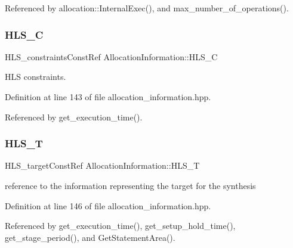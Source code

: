 Referenced by allocation\+::\+Internal\+Exec(), and max\+\_\+number\+\_\+of\+\_\+operations().

\mbox{\label{classAllocationInformation_a6a845a360b25cc43a7f2bf62f45f9a7b}} 
\subsubsection{\texorpdfstring{H\+L\+S\+\_\+C}{HLS\_C}}
{\footnotesize\ttfamily H\+L\+S\+\_\+constraints\+Const\+Ref Allocation\+Information\+::\+H\+L\+S\+\_\+C\hspace{0.3cm}{\ttfamily [private]}}



H\+LS constraints. 



Definition at line 143 of file allocation\+\_\+information.\+hpp.



Referenced by get\+\_\+execution\+\_\+time().

\mbox{\label{classAllocationInformation_acf5858be8528292208147a24d0f6a3ca}} 
\subsubsection{\texorpdfstring{H\+L\+S\+\_\+T}{HLS\_T}}
{\footnotesize\ttfamily H\+L\+S\+\_\+target\+Const\+Ref Allocation\+Information\+::\+H\+L\+S\+\_\+T\hspace{0.3cm}{\ttfamily [private]}}



reference to the information representing the target for the synthesis 



Definition at line 146 of file allocation\+\_\+information.\+hpp.



Referenced by get\+\_\+execution\+\_\+time(), get\+\_\+setup\+\_\+hold\+\_\+time(), get\+\_\+stage\+\_\+period(), and Get\+Statement\+Area().

\mbox{\label{classAllocationInformation_ad32f768daab8ad53b753be8fd23642b3}} 
